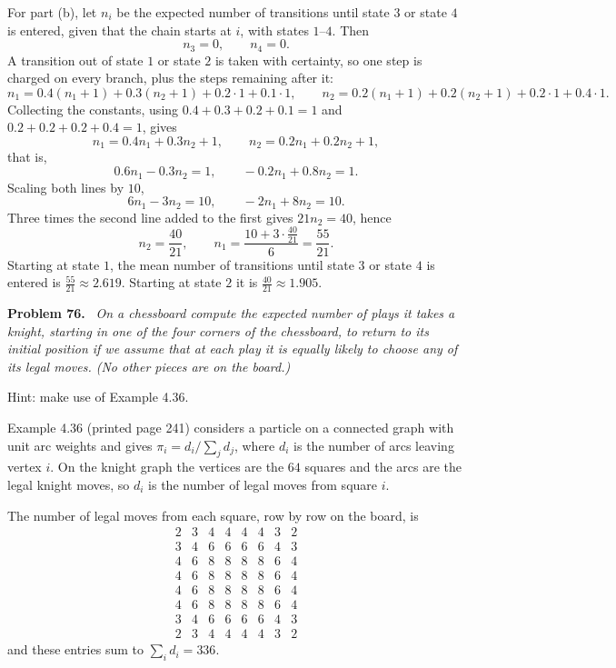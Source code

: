 \documentclass[11pt]{article}
\newenvironment{problem}[1]
  {\par\medskip\noindent\textbf{Problem #1.}\ \itshape}
  {\par\medskip}
\begin{document}
For part (b), let $n_i$ be the expected number of transitions until state $3$ or state $4$ is entered, given that the chain starts at $i$, with states $1$--$4$. Then
\[
n_3=0,\qquad n_4=0.
\]
A transition out of state $1$ or state $2$ is taken with certainty, so one step is charged on every branch, plus the steps remaining after it:
\[
n_1=0.4(n_1+1)+0.3(n_2+1)+0.2\cdot1+0.1\cdot1,\qquad
n_2=0.2(n_1+1)+0.2(n_2+1)+0.2\cdot1+0.4\cdot1.
\]
Collecting the constants, using $0.4+0.3+0.2+0.1=1$ and $0.2+0.2+0.2+0.4=1$, gives
\[
n_1=0.4n_1+0.3n_2+1,\qquad n_2=0.2n_1+0.2n_2+1,
\]
that is,
\[
0.6n_1-0.3n_2=1,\qquad -0.2n_1+0.8n_2=1.
\]
Scaling both lines by $10$,
\[
6n_1-3n_2=10,\qquad -2n_1+8n_2=10.
\]
Three times the second line added to the first gives $21n_2=40$, hence
\[
n_2=\frac{40}{21},\qquad n_1=\frac{10+3\cdot\frac{40}{21}}{6}=\frac{55}{21}.
\]
Starting at state $1$, the mean number of transitions until state $3$ or state $4$ is entered is $\frac{55}{21}\approx2.619$. Starting at state $2$ it is $\frac{40}{21}\approx1.905$.

\begin{problem}{76}
On a chessboard compute the expected number of plays it takes a knight, starting in one of the four corners of the chessboard, to return to its initial position if we assume that at each play it is equally likely to choose any of its legal moves. (No other pieces are on the board.)

Hint: make use of Example 4.36.
\end{problem}
Example 4.36 (printed page 241) considers a particle on a connected graph with unit arc weights and gives $\pi_i=d_i/\sum_j d_j$, where $d_i$ is the number of arcs leaving vertex $i$. On the knight graph the vertices are the $64$ squares and the arcs are the legal knight moves, so $d_i$ is the number of legal moves from square $i$.

The number of legal moves from each square, row by row on the board, is
\[
\begin{matrix}
2&3&4&4&4&4&3&2\\
3&4&6&6&6&6&4&3\\
4&6&8&8&8&8&6&4\\
4&6&8&8&8&8&6&4\\
4&6&8&8&8&8&6&4\\
4&6&8&8&8&8&6&4\\
3&4&6&6&6&6&4&3\\
2&3&4&4&4&4&3&2
\end{matrix}
\]
and these entries sum to $\sum_i d_i=336$.
\end{document}
